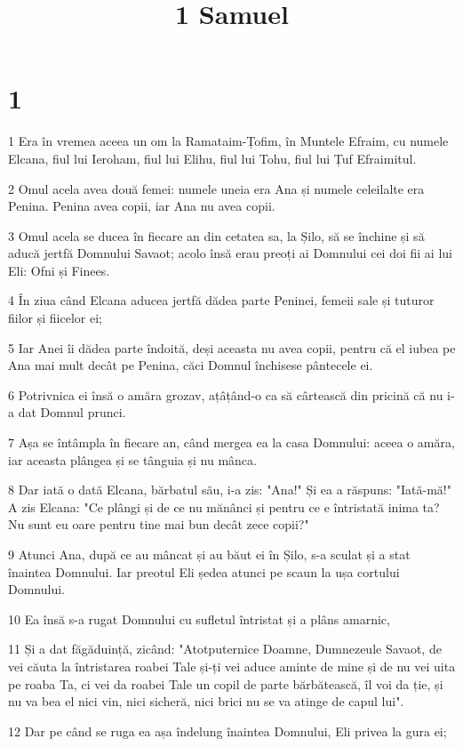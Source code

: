 

\title{1 Samuel}


\chapter{1}

\par 1 Era în vremea aceea un om la Ramataim-Țofim, în Muntele Efraim, cu numele Elcana, fiul lui Ieroham, fiul lui Elihu, fiul lui Tohu, fiul lui Țuf Efraimitul.
\par 2 Omul acela avea două femei: numele uneia era Ana și numele celeilalte era Penina. Penina avea copii, iar Ana nu avea copii.
\par 3 Omul acela se ducea în fiecare an din cetatea sa, la Șilo, să se închine și să aducă jertfă Domnului Savaot; acolo însă erau preoți ai Domnului cei doi fii ai lui Eli: Ofni și Finees.
\par 4 În ziua când Elcana aducea jertfă dădea parte Peninei, femeii sale și tuturor fiilor și fiicelor ei;
\par 5 Iar Anei îi dădea parte îndoită, deși aceasta nu avea copii, pentru că el iubea pe Ana mai mult decât pe Penina, căci Domnul închisese pântecele ei.
\par 6 Potrivnica ei însă o amăra grozav, ațâțând-o ca să cârtească din pricină că nu i-a dat Domnul prunci.
\par 7 Așa se întâmpla în fiecare an, când mergea ea la casa Domnului: aceea o amăra, iar aceasta plângea și se tânguia și nu mânca.
\par 8 Dar iată o dată Elcana, bărbatul său, i-a zis: "Ana!" Și ea a răspuns: "Iată-mă!" A zis Elcana: "Ce plângi și de ce nu mănânci și pentru ce e întristată inima ta? Nu sunt eu oare pentru tine mai bun decât zece copii?"
\par 9 Atunci Ana, după ce au mâncat și au băut ei în Șilo, s-a sculat și a stat înaintea Domnului. Iar preotul Eli ședea atunci pe scaun la ușa cortului Domnului.
\par 10 Ea însă s-a rugat Domnului cu sufletul întristat și a plâns amarnic,
\par 11 Și a dat făgăduință, zicând: "Atotputernice Doamne, Dumnezeule Savaot, de vei căuta la întristarea roabei Tale și-ți vei aduce aminte de mine și de nu vei uita pe roaba Ta, ci vei da roabei Tale un copil de parte bărbătească, îl voi da ție, și nu va bea el nici vin, nici sicheră, nici brici nu se va atinge de capul lui".
\par 12 Dar pe când se ruga ea așa îndelung înaintea Domnului, Eli privea la gura ei;
